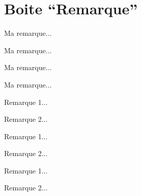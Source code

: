 \documentclass[a4paper,12pt]{article}
\begin{document}
	

	\section{Boite ``Remarque''}


\begin{code}%
\begin{remarque}
	Ma remarque...
\end{remarque}
\end{code}

\begin{remarque}
	Ma remarque...
\end{remarque}%


\begin{code}%
\begin{remarque*}
	Ma remarque...
\end{remarque*}
\end{code}

\begin{remarque*}
	Ma remarque...
\end{remarque*}%


\begin{code}%
\begin{remarques}
	\item Remarque 1...
	\item Remarque 2...
\end{remarques}
\end{code}

\begin{remarques}
	\item Remarque 1...
	\item Remarque 2...
\end{remarques}%

\begin{code}%
\begin{remarques*}
	\item Remarque 1...
	\item Remarque 2...
\end{remarques*}
\end{code}
\end{document}
